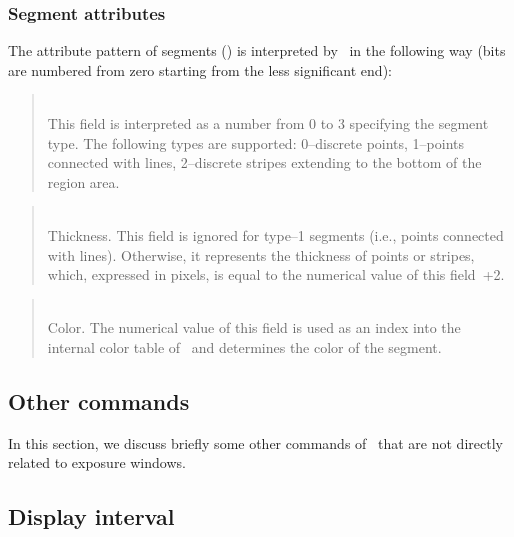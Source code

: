 \subsubsection{Segment attributes}
\label{rm_ds_sa}

The attribute pattern of segments () is interpreted by
\dsd\ in the following way (bits are numbered from zero starting from the
less significant end):


\begin{quote}
\noindent\hspace{-0.35in}{\bf Bits 0--1}\\ \hspace{0in}
This field is interpreted as a number from 0 to 3 specifying the segment
type.
The following types are supported:
0--discrete points, 1--points connected with lines, 2--discrete stripes
extending to the bottom of the region area.
\end{quote}

\begin{quote}
\noindent\hspace{-0.35in}{\bf Bits 2--5}\\ \hspace{0in}
Thickness.
This field is ignored for type--1 segments (i.e., points connected with
lines).
Otherwise, it represents the thickness of points or stripes,
which, expressed in pixels, is equal to the numerical value of this field~+2.
\end{quote}

\begin{quote}
\noindent\hspace{-0.35in}{\bf Bits 6--13}\\ \hspace{0in}
Color.
The numerical value of this field is used as an index into the internal
color table of \dsd\ and determines the color of the segment.
\end{quote}

\subsection{Other commands}

In this section, we discuss briefly some other commands of \dsd\ that are
not directly related to exposure windows.

\subsection{Display interval}

